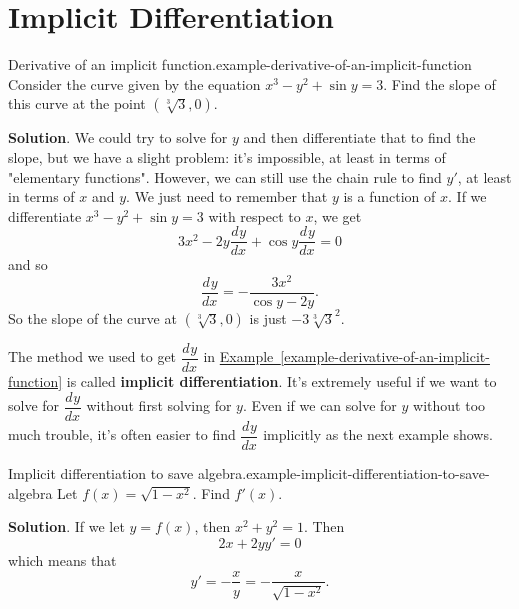 \documentclass[10pt,]{book}
\newcommand{\terminology}[1]{\textbf{#1}}
\numberwithin{equation}{section}
\newcommand{\dv}[3][]{\dfrac{d^{#1} #2}{d #3^{#1}}}
\begin{document}
\section[{Implicit Differentiation}]{Implicit Differentiation}\label{section-implicit-differentiation}
\begin{example}{Derivative of an implicit function.}{example-derivative-of-an-implicit-function}%
\hypertarget{p-158}{}%
Consider the curve given by the equation \(x^{3} - y^{2} + \sin y = 3\). Find the slope of this curve at the point \((\sqrt[3]{3},0)\).%
\par\smallskip%
\noindent\textbf{Solution}.\hypertarget{solution-33}{}\quad%
\hypertarget{p-159}{}%
We could try to solve for \(y\) and then differentiate that to find the slope, but we have a slight problem: it's impossible, at least in terms of "elementary functions". However, we can still use the chain rule to find \(y'\), at least in terms of \(x\) and \(y\). We just need to remember that \(y\) is a function of \(x\). If we differentiate \(x^{3} - y^{2} + \sin y = 3\) with respect to \(x\), we get%
\begin{equation*}
3x^{2} - 2y\dv{y}{x} + \cos y \dv{y}{x} = 0
\end{equation*}
and so%
\begin{equation*}
\dv{y}{x} = -\frac{3x^{2}}{\cos y - 2y}.
\end{equation*}
So the slope of the curve at \((\sqrt[3]{3},0)\) is just \(-3\sqrt[3]{3}^{2}\).%
\end{example}
\hypertarget{p-160}{}%
The method we used to get \(\dv{y}{x}\) in \hyperref[example-derivative-of-an-implicit-function]{Example~\ref{example-derivative-of-an-implicit-function}} is called \terminology{implicit differentiation}. It's extremely useful if we want to solve for \(\dv{y}{x}\) without first solving for \(y\). Even if we can solve for \(y\) without too much trouble, it's often easier to find \(\dv{y}{x}\) implicitly as the next example shows.%
\begin{example}{Implicit differentiation to save algebra.}{example-implicit-differentiation-to-save-algebra}%
\hypertarget{p-161}{}%
Let \(f(x) = \sqrt{1-x^{2}}\). Find \(f'(x)\).%
\par\smallskip%
\noindent\textbf{Solution}.\hypertarget{solution-34}{}\quad%
\hypertarget{p-162}{}%
If we let \(y=f(x)\), then \(x^{2} + y^{2} = 1\). Then%
\begin{equation*}
2x + 2yy' = 0
\end{equation*}
which means that%
\begin{equation*}
y' = -\frac{x}{y} = -\frac{x}{\sqrt{1-x^{2}}}.
\end{equation*}
%
\end{example}
\end{document}
